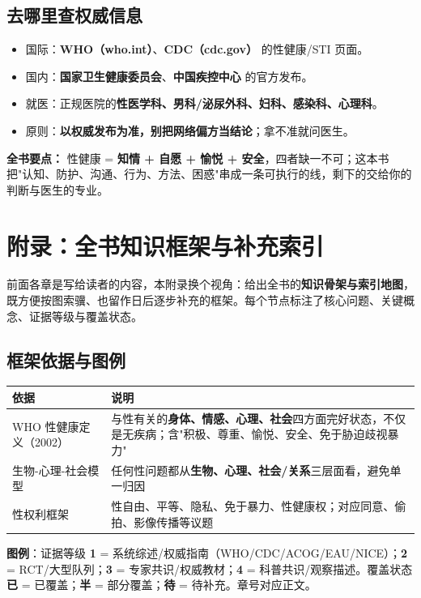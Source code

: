 \documentclass[12pt,UTF8,openany]{ctexbook}
\begin{document}
\section{去哪里查权威信息}

\begin{itemize}[leftmargin=2em,itemsep=0.3em]
  \item 国际：\textbf{WHO（who.int）}、\textbf{CDC（cdc.gov）} 的性健康/STI 页面。
  \item 国内：\textbf{国家卫生健康委员会}、\textbf{中国疾控中心} 的官方发布。
  \item 就医：正规医院的\textbf{性医学科、男科/泌尿外科、妇科、感染科、心理科}。
  \item 原则：\textbf{以权威发布为准，别把网络偏方当结论}；拿不准就问医生。
\end{itemize}

\vspace{1em}
\noindent\textbf{全书要点：} 性健康 = \textbf{知情 + 自愿 + 愉悦 + 安全}，四者缺一不可；这本书把"认知、防护、沟通、行为、方法、困惑"串成一条可执行的线，剩下的交给你的判断与医生的专业。

\chapter{附录：全书知识框架与补充索引}

前面各章是写给读者的内容，本附录换个视角：给出全书的\textbf{知识骨架与索引地图}，既方便按图索骥、也留作日后逐步补充的框架。每个节点标注了核心问题、关键概念、证据等级与覆盖状态。

\section{框架依据与图例}

\begin{tabularx}{\linewidth}{X X}
\toprule
\textbf{依据} & \textbf{说明} \\
\midrule
WHO 性健康定义（2002） & 与性有关的\textbf{身体、情感、心理、社会}四方面完好状态，不仅是无疾病；含"积极、尊重、愉悦、安全、免于胁迫歧视暴力" \\
生物-心理-社会模型 & 任何性问题都从\textbf{生物、心理、社会/关系}三层面看，避免单一归因 \\
性权利框架 & 性自由、平等、隐私、免于暴力、性健康权；对应同意、偷拍、影像传播等议题 \\
\bottomrule
\end{tabularx}

\vspace{0.5em}
\noindent\textbf{图例}：证据等级 \textbf{1} = 系统综述/权威指南（WHO/CDC/ACOG/EAU/NICE）；\textbf{2} = RCT/大型队列；\textbf{3} = 专家共识/权威教材；\textbf{4} = 科普共识/观察描述。覆盖状态 \textbf{已} = 已覆盖；\textbf{半} = 部分覆盖；\textbf{待} = 待补充。章号对应正文。
\end{document}

